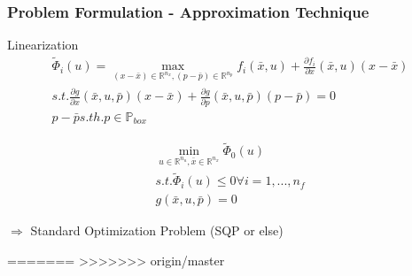 \begin{frame}
	\frametitle{Problem Formulation - Approximation Technique}

\begin{block}{Linearization}
	\begin{align*}
	\tilde{\Phi}_{i}(u)=\max_{(x-\bar{x})\in\mathbb{R}^{n_{x}}, (p-\bar{p})\in\mathbb{R}^{n_{p}}} f_{i}(\bar{x}, u)+\frac{\partial f_{i}}{\partial x}(\bar{x}, u)(x-\bar{x})\\
	s.t. \frac{\partial g}{\partial x}(\bar{x}, u, \bar{p})(x-\bar{x})+\frac{\partial g}{\partial p}(\bar{x}, u, \bar{p})(p-\bar{p})=0\\
	p-\bar{p} s.th. p\in\mathbb{P}_{box}
	\end{align*}
\end{block}	
	

	
\begin{block}	

\begin{align*}
\min_{u\in\mathbb{R}^{n_{u}}, \bar{x}\in\mathbb{R}^{n_{x}}} \tilde{\Phi}_{0}(u)\\
s.t. \tilde{\Phi}_{i}(u)\leq 0 \forall i=1,...,n_{f}\\
g(\bar{x}, u, \bar{p})=0
\end{align*}
\end{block} 
	
$\Rightarrow$ Standard Optimization Problem (SQP or else)
\end{frame}
=======
>>>>>>> origin/master
